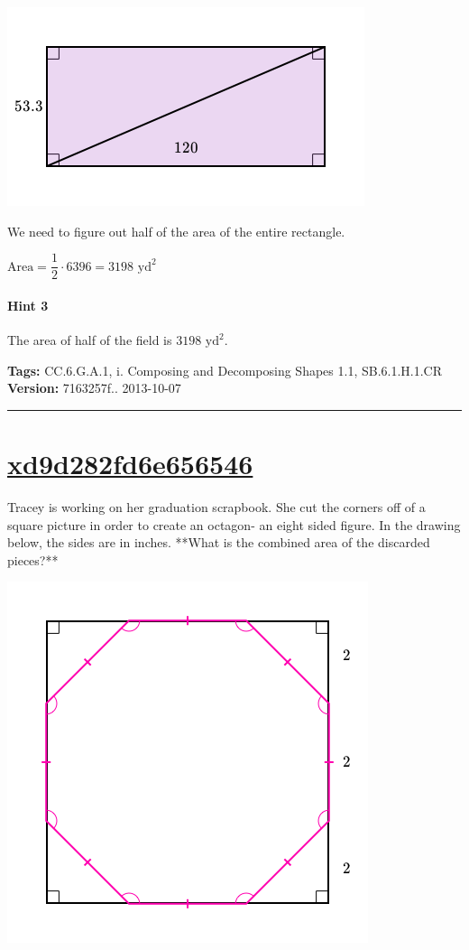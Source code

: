 \documentclass[twocolumn,10pt]{article}
\def\shrinkfactor{0.55}
\begin{document}
\includegraphics[scale=\shrinkfactor]{figures/269435c20ae3ae1379cfea0397f70d52a628c4eb.png}  

We need to figure out half of the area of the entire rectangle.    

${\text{Area}}=\dfrac{1}{2}\cdot6396=3198\text{ yd}^2$  

\paragraph{Hint 3}The area of half of the field is $3198\text{ yd}^2$.



\medskip
\noindent
\textbf{Tags:} {\footnotesize CC.6.G.A.1, i.	Composing and Decomposing Shapes 1.1, SB.6.1.H.1.CR}\\
\textbf{Version:} 7163257f.. 2013-10-07
\smallskip\hrule





\section{\href{https://www.khanacademy.org/devadmin/content/items/xd9d282fd6e656546}{xd9d282fd6e656546}}

\noindent
Tracey is working on her graduation scrapbook.  She cut the corners off of a square picture in order to create an octagon- an eight sided figure.  In the drawing below, the sides are in inches.  **What is the combined area of the discarded pieces?**  


\includegraphics[scale=\shrinkfactor]{figures/594b710dd149095c7310e73a8ff73437fd084a77.png}
\end{document}
